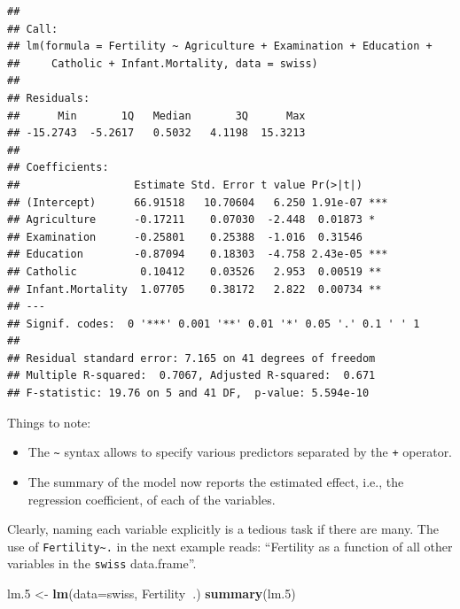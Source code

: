 \documentclass[]{book}
\newenvironment{Shaded}{\begin{snugshade}}{\end{snugshade}}
\newcommand{\KeywordTok}[1]{\textcolor[rgb]{0.13,0.29,0.53}{\textbf{#1}}}
\newcommand{\DataTypeTok}[1]{\textcolor[rgb]{0.13,0.29,0.53}{#1}}
\newcommand{\DecValTok}[1]{\textcolor[rgb]{0.00,0.00,0.81}{#1}}
\newcommand{\StringTok}[1]{\textcolor[rgb]{0.31,0.60,0.02}{#1}}
\newcommand{\OperatorTok}[1]{\textcolor[rgb]{0.81,0.36,0.00}{\textbf{#1}}}
\newcommand{\NormalTok}[1]{#1}
\providecommand{\tightlist}{%
  \setlength{\itemsep}{0pt}\setlength{\parskip}{0pt}}
\theoremstyle{definition}
\theoremstyle{definition}
\theoremstyle{definition}
\theoremstyle{remark}
\begin{document}
\begin{verbatim}
## 
## Call:
## lm(formula = Fertility ~ Agriculture + Examination + Education + 
##     Catholic + Infant.Mortality, data = swiss)
## 
## Residuals:
##      Min       1Q   Median       3Q      Max 
## -15.2743  -5.2617   0.5032   4.1198  15.3213 
## 
## Coefficients:
##                  Estimate Std. Error t value Pr(>|t|)    
## (Intercept)      66.91518   10.70604   6.250 1.91e-07 ***
## Agriculture      -0.17211    0.07030  -2.448  0.01873 *  
## Examination      -0.25801    0.25388  -1.016  0.31546    
## Education        -0.87094    0.18303  -4.758 2.43e-05 ***
## Catholic          0.10412    0.03526   2.953  0.00519 ** 
## Infant.Mortality  1.07705    0.38172   2.822  0.00734 ** 
## ---
## Signif. codes:  0 '***' 0.001 '**' 0.01 '*' 0.05 '.' 0.1 ' ' 1
## 
## Residual standard error: 7.165 on 41 degrees of freedom
## Multiple R-squared:  0.7067, Adjusted R-squared:  0.671 
## F-statistic: 19.76 on 5 and 41 DF,  p-value: 5.594e-10
\end{verbatim}

Things to note:

\begin{itemize}
\tightlist
\item
  The \texttt{\textasciitilde{}} syntax allows to specify various
  predictors separated by the \texttt{+} operator.
\item
  The summary of the model now reports the estimated effect, i.e., the
  regression coefficient, of each of the variables.
\end{itemize}

Clearly, naming each variable explicitly is a tedious task if there are
many. The use of \texttt{Fertility\textasciitilde{}.} in the next
example reads: ``Fertility as a function of all other variables in the
\texttt{swiss} data.frame''.

\begin{Shaded}
\begin{Highlighting}[]
\NormalTok{lm.}\DecValTok{5}\NormalTok{ <-}\StringTok{ }\KeywordTok{lm}\NormalTok{(}\DataTypeTok{data=}\NormalTok{swiss, Fertility}\OperatorTok{~}\NormalTok{.)}
\KeywordTok{summary}\NormalTok{(lm.}\DecValTok{5}\NormalTok{)}
\end{Highlighting}
\end{Shaded}
\end{document}
